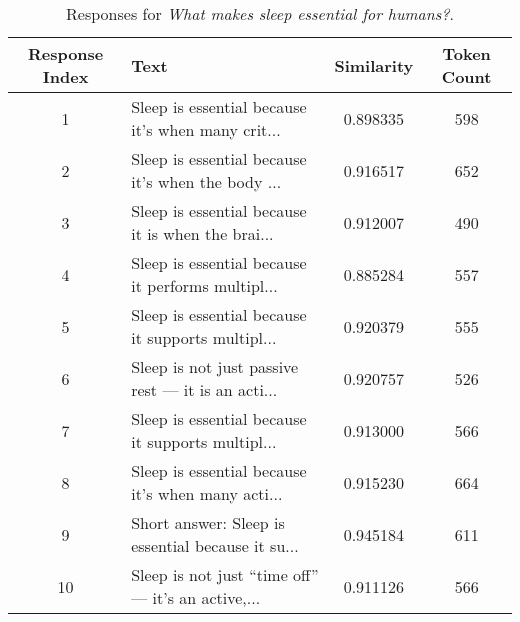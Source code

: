 \documentclass{article}
\begin{document}
\begin{table}[ht]
    \centering
    \caption{Responses for \textit{What makes sleep essential for humans?}.}
    \label{tab:what_makes_sleep_essential}
    \begin{tabular}{c >{\raggedright\arraybackslash}p{8cm} S[table-format=1.6] c}
        \toprule
        Response Index & Text & Similarity & Token Count\\
         & Sleep is essential because it’s when many crit... & 0.898335 & 598\\
        2 & Sleep is essential because it’s when the body ... & 0.916517 & 652\\
        3 & Sleep is essential because it is when the brai... & 0.912007 & 490\\
        4 & Sleep is essential because it performs multipl... & 0.885284 & 557\\
        5 & Sleep is essential because it supports multipl... & 0.920379 & 555\\
        6 & Sleep is not just passive rest — it is an acti... & 0.920757 & 526\\
        7 & Sleep is essential because it supports multipl... & 0.913000 & 566\\
        8 & Sleep is essential because it’s when many acti... & 0.915230 & 664\\
        9 & Short answer: Sleep is essential because it su... & 0.945184 & 611\\
        10 & Sleep is not just “time off” — it’s an active,... & 0.911126 & 566\\
        \bottomrule
    \end{tabular}
\end{table}
\end{document}
